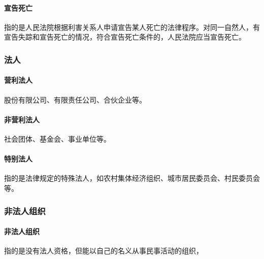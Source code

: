 \paragraph{宣告死亡} 指的是人民法院根据利害关系人申请宣告某人死亡的法律程序。对同一自然人，有宣告失踪和宣告死亡的情况，符合宣告死亡条件的，人民法院应当宣告死亡。

\subsubsection{法人}

\paragraph{营利法人} 股份有限公司、有限责任公司、合伙企业等。

\paragraph{非营利法人} 社会团体、基金会、事业单位等。

\paragraph{特别法人} 指的是法律规定的特殊法人，如农村集体经济组织、城市居民委员会、村民委员会等。

\subsubsection{非法人组织}

\paragraph{非法人组织} 指的是没有法人资格，但能以自己的名义从事民事活动的组织，
